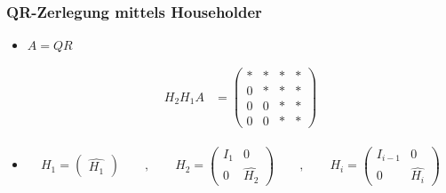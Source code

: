 \clearpage
\setcounter{page}{4}
\begin{frame}
\frametitle{QR-Zerlegung mittels Householder}

\begin{itemize}
	\item $ A = QR $

		\begin{align*}
		H_2 H_1 A &= \left( 
		\begin{array}{cccc}
		* & * & * & * \\ 
		0 & * & * & * \\ 
		0 & 0 & * & * \\ 
		0 & 0 & * & *
		\end{array}
		\right)
		\end{align*} 
	
	\item
	\begin{align*}
	H_1 = \begin{pmatrix}
	\hat{H_1} 
	\end{pmatrix} \qquad , \qquad
	H_2 = \left(\begin{array}{l|l}
	I_{1} & 0\\ \hline
	0 & \hat{H_2} 	
	\end{array} \right)\qquad , \qquad
	H_i = \left(\begin{array}{l|l}
	I_{i-1} & 0\\ \hline
	0 & \hat{H_i} 	
	\end{array} \right)
	\end{align*}
\end{itemize}
\end{frame}


